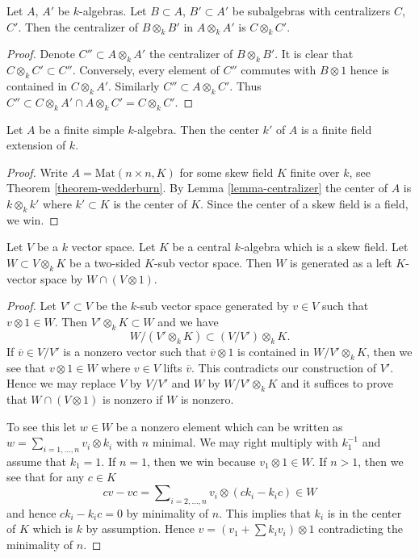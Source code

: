 \begin{lemma}
\label{lemma-centralizer}
Let $A$, $A'$ be $k$-algebras. Let $B \subset A$, $B' \subset A'$ be
subalgebras with centralizers $C$, $C'$. Then the centralizer of
$B \otimes_k B'$ in $A \otimes_k A'$ is $C \otimes_k C'$.
\end{lemma}

\begin{proof}
Denote $C'' \subset A \otimes_k A'$ the centralizer of $B \otimes_k B'$.
It is clear that $C \otimes_k C' \subset C''$. Conversely, every element
of $C''$ commutes with $B \otimes 1$ hence is contained in $C \otimes_k A'$.
Similarly $C'' \subset A \otimes_k C'$. Thus
$C'' \subset C \otimes_k A' \cap A \otimes_k C' = C \otimes_k C'$.
\end{proof}

\begin{lemma}
\label{lemma-center-csa}
Let $A$ be a finite simple $k$-algebra. Then the center $k'$ of $A$
is a finite field extension of $k$.
\end{lemma}

\begin{proof}
Write $A = \text{Mat}(n \times n, K)$ for some skew field $K$ finite
over $k$, see
Theorem \ref{theorem-wedderburn}.
By
Lemma \ref{lemma-centralizer}
the center of $A$ is $k \otimes_k k'$ where $k' \subset K$ is the
center of $K$. Since the center of a skew field is a field, we win.
\end{proof}

\begin{lemma}
\label{lemma-generate-two-sided-sub}
Let $V$ be a $k$ vector space. Let $K$ be a central $k$-algebra
which is a skew field. Let $W \subset V \otimes_k K$ be a two-sided
$K$-sub vector space. Then $W$ is generated as a left $K$-vector
space by $W \cap (V \otimes 1)$.
\end{lemma}

\begin{proof}
Let $V' \subset V$ be the $k$-sub vector space generated by $v \in V$
such that $v \otimes 1 \in W$. Then $V' \otimes_k K \subset W$ and
we have
$$
W/(V' \otimes_k K)  \subset  (V/V') \otimes_k K.
$$
If $\overline{v} \in V/V'$ is a nonzero vector such that
$\overline{v} \otimes 1$ is contained in $W/V' \otimes_k K$,
then we see that $v \otimes 1 \in W$ where $v \in V$ lifts $\overline{v}$.
This contradicts our construction of $V'$. Hence we may replace
$V$ by $V/V'$ and $W$ by $W/V' \otimes_k K$ and it suffices to prove
that $W \cap (V \otimes 1)$ is nonzero if $W$ is nonzero.

\medskip\noindent
To see this let $w \in W$ be a nonzero element which can be written
as $w = \sum_{i = 1, \ldots, n} v_i \otimes k_i$ with $n$ minimal.
We may right multiply with $k_1^{-1}$ and assume that $k_1 = 1$.
If $n = 1$, then we win because $v_1 \otimes 1 \in W$.
If $n > 1$, then we see that for any $c \in K$
$$
c v - v c = \sum\nolimits_{i = 2, \ldots, n} v_i \otimes (c k_i - k_i c) \in W
$$
and hence $c k_i - k_i c = 0$ by minimality of $n$.
This implies that $k_i$ is in the center of $K$ which is $k$ by
assumption. Hence $v = (v_1 + \sum k_i v_i) \otimes 1$ contradicting
the minimality of $n$.
\end{proof}

